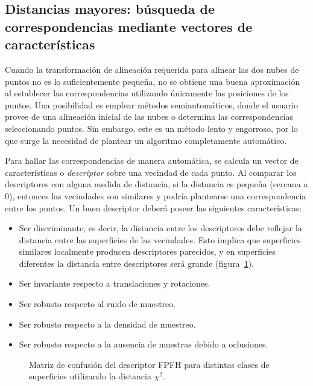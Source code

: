 \subsection{Distancias mayores: búsqueda de correspondencias mediante vectores de características}
Cuando la transformación de alineación requerida para alinear las dos nubes de puntos
no es lo suficientemente pequeña, no se obtiene una buena aproximación al establecer las correspondencias
utilizando únicamente las posiciones de los puntos.
Una posibilidad es emplear métodos semiautomáticos, donde el usuario provee de una alineación inicial
de las nubes o determina las correspondencias seleccionando puntos.
Sin embargo, este es un método lento y engorroso,
por lo que surge la necesidad de plantear un algoritmo completamente automático.

Para hallar las correspondencias de manera automática, se calcula un vector de características o \emph{descriptor}
sobre una vecindad de cada punto. Al comparar los descriptores con alguna medida de distancia,
si la distancia es pequeña (cercana a $0$), entonces las vecindades son similares
y podría plantearse una correspondencia entre los puntos.
Un buen descriptor deberá poseer las siguientes características:
\begin{itemize}
	\item Ser discriminante, es decir, la distancia entre los descriptores debe reflejar
		la distancia entre las superficies de las vecindades.
		Esto implica que superficies similares localmente producen descriptores parecidos, y
		en superficies diferentes la distancia entre descriptores será grande (figura~\ref{fig:descriptor_matriz_confusion}).
	\item Ser invariante respecto a translaciones y rotaciones.
	\item Ser robusto respecto al ruido de muestreo.
	\item Ser robusto respecto a la densidad de muestreo.
	\item Ser robusto respecto a la ausencia de muestras debido a oclusiones.
\end{itemize}

\begin{figure}
	\centering
	
	\caption[Matriz de confusión del descriptor FPFH]{\label{fig:descriptor_matriz_confusion}Matriz de confusión del descriptor FPFH para distintas clases de superficies utilizando la distancia $\chi^2$.}
\end{figure}

